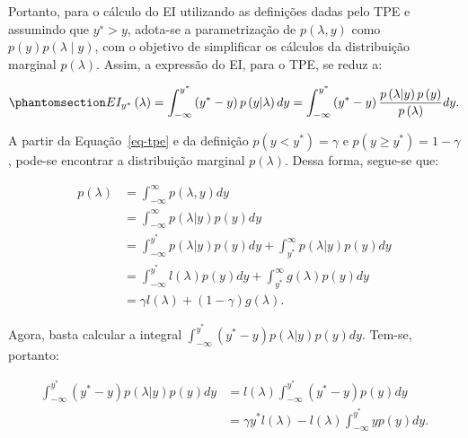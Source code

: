 \documentclass[
  12pt,
  a4paper,
]{scrreprt}
\begin{document}
\vspace{12pt}

Portanto, para o cálculo do EI utilizando as definições dadas pelo TPE e
assumindo que \(y^∗>y\), adota-se a parametrização de
\(p\left(\lambda,y\right)\) como
\(p\left(y\right)p\left(\lambda∣y\right)\), com o objetivo de
simplificar os cálculos da distribuição marginal
\(p\left(\lambda\right)\). Assim, a expressão do EI, para o TPE, se
reduz a:

\begin{equation}\phantomsection\label{eq-exp}{
EI_{y^*}\left(\lambda\right) = \int_{-\infty}^{y^*} \left(y^* - y\right)p\left(y | \lambda\right) dy = \int_{-\infty}^{y^*} \left(y^* - y\right)\frac{p\left(\lambda | y\right) p\left(y \right)}{p\left(\lambda\right)} dy\text{.}
}\end{equation}

A partir da Equação~\ref{eq-tpe} e da definição
\(p\left(y < y^*\right) = \gamma\) e
\(p\left(y \geq y^*\right) = 1 - \gamma\), pode-se encontrar a
distribuição marginal \(p\left(\lambda\right)\). Dessa forma, segue-se
que:

\[
\begin{aligned}
p\left(\lambda\right) &= \int_{-\infty}^{\infty} p\left(\lambda, y\right) dy \\
&= \int_{-\infty}^{\infty} p\left(\lambda | y\right) p\left(y\right) dy \\
&= \int_{-\infty}^{y^*} p\left(\lambda | y\right) p\left(y\right) dy + \int_{y^*}^{\infty} p\left(\lambda | y\right) p\left(y\right) dy \\
&= \int_{-\infty}^{y^*} l\left(\lambda\right) p\left(y\right) dy + \int_{y^*}^{\infty} g\left(\lambda\right) p\left(y\right) dy \\
&= \gamma l\left(\lambda\right) + \left(1 - \gamma\right) g\left(\lambda\right)\text{.}
\end{aligned}
\]

Agora, basta calcular a integral
\(\int_{-\infty}^{y^*}\left(y^* - y\right) p\left(\lambda|y\right)p\left(y\right)dy\).
Tem-se, portanto:

\[
\begin{aligned}
\int_{-\infty}^{y^*}\left(y^* - y\right) p\left(\lambda|y\right)p\left(y\right)dy &= l\left(\lambda\right) \int_{-\infty}^{y^*} \left(y^* - y\right) p\left(y\right)dy \\
&= \gamma y^{*} l\left(\lambda\right) - l\left(\lambda\right) \int_{-\infty}^{y^*} y p\left(y\right)dy\text{.}
\end{aligned}
\]
\end{document}
